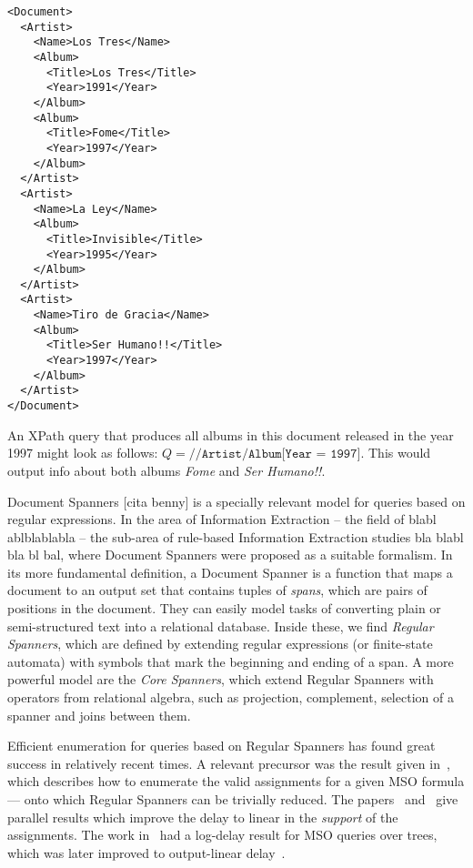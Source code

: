 \begin{multicols}{2}
	\begin{small}
	\begin{verbatim}
<Document>
  <Artist>
    <Name>Los Tres</Name>
    <Album>
      <Title>Los Tres</Title>
      <Year>1991</Year>
    </Album>
    <Album>
      <Title>Fome</Title>
      <Year>1997</Year>
    </Album>
  </Artist>
  <Artist>
    <Name>La Ley</Name>
    <Album>
      <Title>Invisible</Title>
      <Year>1995</Year>
    </Album>
  </Artist>
  <Artist>
    <Name>Tiro de Gracia</Name>
    <Album>
      <Title>Ser Humano!!</Title>
      <Year>1997</Year>
    </Album>
  </Artist>
</Document>
	\end{verbatim}
	\end{small}
\end{multicols}


An XPath query that produces all albums in this document released in the year 1997 might look as follows: $Q = \texttt{//Artist/Album[Year = 1997]}$. This would output info about both albums {\it Fome} and {\it Ser Humano!!}.

Document Spanners [cita benny] is a specially relevant model for queries based on regular expressions. In the area of Information Extraction -- the field of blabl ablblablabla -- the sub-area of rule-based Information Extraction studies bla blabl bla bl bal, where Document Spanners were proposed as a suitable formalism.  In its more fundamental definition, a Document Spanner is a function that maps a document to an output set that contains tuples of {\it spans}, which are pairs of positions in the document. They can easily model tasks of converting plain or semi-structured text into a relational database. Inside these, we find {\it Regular Spanners}, which are defined by extending regular expressions (or finite-state automata) with symbols that mark the beginning and ending of a span. A more powerful model are the {\it Core Spanners}, which extend Regular Spanners with operators from relational algebra, such as projection, complement, selection of a spanner and joins between them. 

Efficient enumeration for queries based on Regular Spanners has found great success in relatively recent times. A relevant precursor was the result given in~\cite{bagan2006mso}, which describes how to enumerate the valid assignments for a given MSO formula --- onto which Regular Spanners can be trivially reduced. The papers~\cite{FlorenzanoRUVV20} and~\cite{amarilli2019constant} give parallel results which improve the delay to linear in the {\it support} of the assignments. The work in~\cite{Niewerth18} had a log-delay result for MSO queries over trees, which was later improved to output-linear delay~\cite{amarilli2019enumeration}. 

